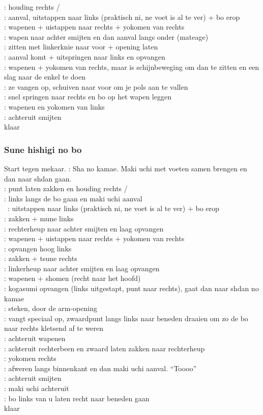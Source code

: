 \pB: houding rechts /\\
\pB: aanval, uitstappen naar links (praktisch ni, ne voet is al te ver) + bo erop\\
\pB: wapenen + uistappen naar rechts + yokomen van rechts\\
\pB: wapen naar achter smijten en dan aanval langs onder (mateage)\\
\pB: zitten met linkerknie naar voor + opening laten\\
\pB: aanval komt + uitspringen naar links en opvangen\\
\pB: wapenen + yokomen van rechts, maar is schijnbeweging om dan te zitten en een slag naar de enkel te doen\\
\pA: ze vangen op, schuiven naar voor om je pols aan te vallen\\
\pB: snel springen naar rechts en bo op het wapen leggen\\
\pB: wapenen en yokomen van links\\
\pB: achteruit smijten\\
klaar

\subsubsection{Sune hishigi no bo}

Start tegen mekaar.
\pA: Sha no kamae. Maki uchi met voeten samen brengen en dan naar shdan gaan.\\
\pB: punt laten zakken en houding rechts /\\
\pA: links langs de bo gaan en maki uchi aanval\\\
\pB: uitstappen naar links (praktisch ni, ne voet is al te ver) + bo erop\\
\pB: zakken + mune links\\
\pA: rechterheup naar achter smijten en laag opvangen\\
\pB: wapenen + uistappen naar rechts + yokomen van rechts\\
\pA: opvangen hoog links\\
\pB: zakken + tsune rechts\\
\pA: linkerheup naar achter smijten en laag opvangen\\
\pB: wapenen + shomen (recht naar het hoofd)\\
\pA: kogasumi opvangen (links uitgestapt, punt naar rechts), gaat dan naar shdan no kamae\\
\pB: steken, door de arm-opening\\
\pA: vangt speciaal op, zwaardpunt langs links naar beneden draaien om zo de bo naar rechts kletsend af te weren\\
\pB: achteruit wapenen\\
\pA: achteruit rechterbeen en zwaard laten zakken naar rechterheup\\
\pB: yokomen rechts\\
\pA: afweren langs binnenkant en dan maki uchi aanval. ``Toooo''\\
\pB: achteruit smijten\\
\pA: maki uchi achteruit\\
\pB: bo links van u laten recht naar beneden gaan\\
klaar

